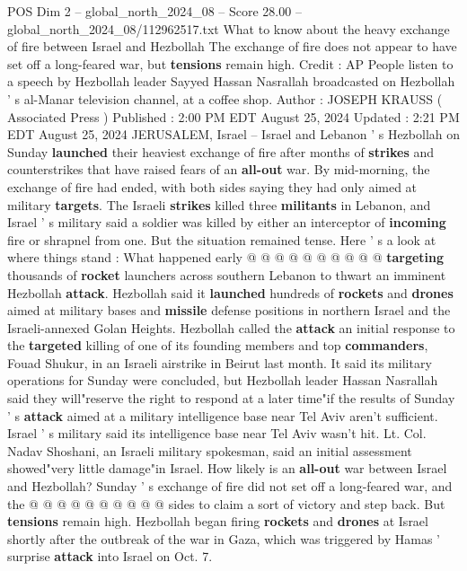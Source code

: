 \begin{textsample}{POS Dim 2 – global\_north\_2024\_08 – Score 28.00 – global\_north\_2024\_08/112962517.txt}  \label{ex:f2_pos_089}
What to know about the heavy exchange of fire between Israel and Hezbollah The exchange of fire does not appear to have set off a long-feared war, but \textbf{tensions} remain high.
Credit : AP People listen to a speech by Hezbollah leader Sayyed Hassan Nasrallah broadcasted on Hezbollah ' s al-Manar television channel, at a coffee shop.
Author : JOSEPH KRAUSS ( Associated Press ) Published : 2:00 PM EDT August 25, 2024 Updated : 2:21 PM EDT August 25, 2024 JERUSALEM, Israel -- Israel and Lebanon ' s Hezbollah on Sunday \textbf{launched} their heaviest exchange of fire after months of \textbf{strikes} and counterstrikes that have raised fears of an \textbf{all-out} war.
By mid-morning, the exchange of fire had ended, with both sides saying they had only aimed at military \textbf{targets}.
The Israeli \textbf{strikes} killed three \textbf{militants} in Lebanon, and Israel ' s military said a soldier was killed by either an interceptor of \textbf{incoming} fire or shrapnel from one.
But the situation remained tense.
Here ' s a look at where things stand : What happened early @ @ @ @ @ @ @ @ @ @ \textbf{targeting} thousands of \textbf{rocket} launchers across southern Lebanon to thwart an imminent Hezbollah \textbf{attack}.
Hezbollah said it \textbf{launched} hundreds of \textbf{rockets} and \textbf{drones} aimed at military bases and \textbf{missile} defense positions in northern Israel and the Israeli-annexed Golan Heights.
Hezbollah called the \textbf{attack} an initial response to the \textbf{targeted} killing of one of its founding members and top \textbf{commanders}, Fouad Shukur, in an Israeli airstrike in Beirut last month.
It said its military operations for Sunday were concluded, but Hezbollah leader Hassan Nasrallah said they will"reserve the right to respond at a later time"if the results of Sunday ' s \textbf{attack} aimed at a military intelligence base near Tel Aviv aren't sufficient.
Israel ' s military said its intelligence base near Tel Aviv wasn't hit.
Lt.
Col.
Nadav Shoshani, an Israeli military spokesman, said an initial assessment showed"very little damage"in Israel.
How likely is an \textbf{all-out} war between Israel and Hezbollah?
Sunday ' s exchange of fire did not set off a long-feared war, and the @ @ @ @ @ @ @ @ @ @ sides to claim a sort of victory and step back.
But \textbf{tensions} remain high.
Hezbollah began firing \textbf{rockets} and \textbf{drones} at Israel shortly after the outbreak of the war in Gaza, which was triggered by Hamas ' surprise \textbf{attack} into Israel on Oct. 7.

\end{textsample}
